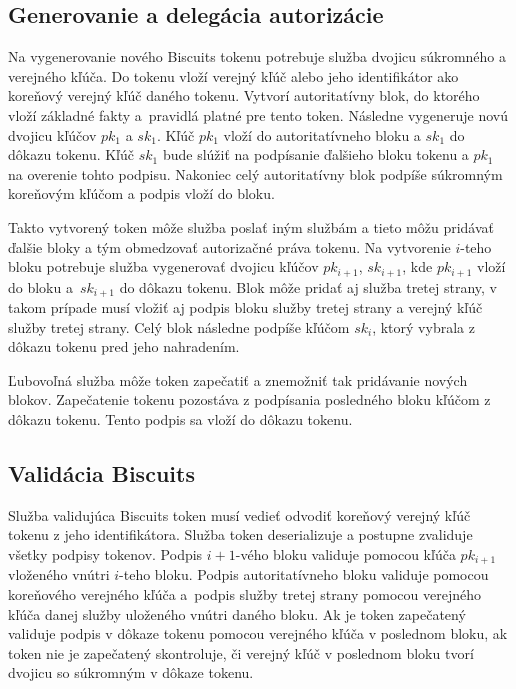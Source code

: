 \subsection{Generovanie a delegácia autorizácie}

Na vygenerovanie nového Biscuits tokenu potrebuje služba dvojicu súkromného a verejného kľúča. Do tokenu vloží verejný kľúč alebo jeho identifikátor ako koreňový verejný kľúč daného tokenu. Vytvorí autoritatívny blok, do ktorého vloží základné fakty a~pravidlá platné pre tento token. Následne vygeneruje novú dvojicu kľúčov $pk_1$ a $sk_1$. Kľúč $pk_1$ vloží do autoritatívneho bloku a $sk_1$ do dôkazu tokenu. Kľúč $sk_1$ bude slúžiť na podpísanie ďalšieho bloku tokenu a $pk_1$ na overenie tohto podpisu. Nakoniec celý autoritatívny blok podpíše súkromným koreňovým kľúčom a podpis vloží do bloku.

Takto vytvorený token môže služba poslať iným službám a tieto môžu pridávať ďalšie bloky a tým obmedzovať autorizačné práva tokenu. Na vytvorenie $i$-teho bloku potrebuje služba vygenerovať dvojicu kľúčov $pk_{i+1}$, $sk_{i+1}$, kde $pk_{i+1}$ vloží do bloku a~$sk_{i+1}$ do dôkazu tokenu. Blok môže pridať aj služba tretej strany, v takom prípade musí vložiť aj podpis bloku služby tretej strany a verejný kľúč služby tretej strany. Celý blok následne podpíše kľúčom $sk_i$, ktorý vybrala z dôkazu tokenu pred jeho nahradením.

Ľubovoľná služba môže token zapečatiť a znemožniť tak pridávanie nových blokov. Zapečatenie tokenu pozostáva z podpísania posledného bloku kľúčom z dôkazu tokenu. Tento podpis sa vloží do dôkazu tokenu.

\subsection{Validácia Biscuits}

Služba validujúca Biscuits token musí vedieť odvodiť koreňový verejný kľúč tokenu z jeho identifikátora. Služba token deserializuje a postupne zvaliduje všetky podpisy tokenov. Podpis $i+1$-vého bloku validuje pomocou kľúča $pk_{i+1}$ vloženého vnútri $i$-teho bloku. Podpis autoritatívneho bloku validuje pomocou koreňového verejného kľúča a~podpis služby tretej strany pomocou verejného kľúča danej služby uloženého vnútri daného bloku. Ak je token zapečatený validuje podpis v dôkaze tokenu pomocou verejného kľúča v poslednom bloku, ak token nie je zapečatený skontroluje, či verejný kľúč v poslednom bloku tvorí dvojicu so súkromným v dôkaze tokenu.

